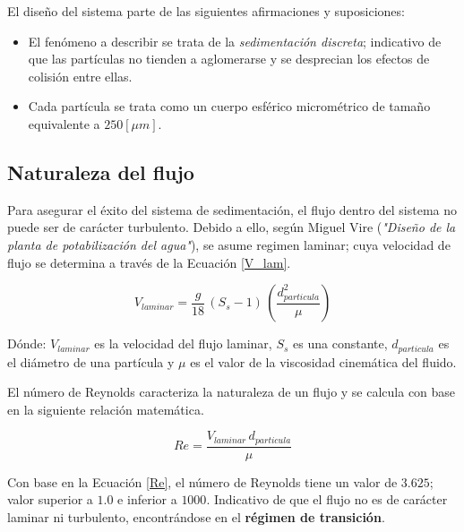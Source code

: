 \noindent
\justify

El dise\~no del sistema parte de las siguientes afirmaciones y suposiciones:

\begin{itemize}
	\item El fen\'omeno a describir se trata de la \textit{sedimentaci\'on discreta}; indicativo de que las part\'iculas no tienden a aglomerarse y se desprecian los efectos de colisi\'on entre ellas. 
	\item Cada part\'icula se trata como un cuerpo esf\'erico microm\'etrico de tama\~no equivalente a $250 [\mu m]$.
\end{itemize}

\subsection{Naturaleza del flujo}

\noindent
\justify

Para asegurar el \'exito del sistema de sedimentaci\'on, el flujo dentro del sistema no puede ser de car\'acter turbulento. Debido a ello, seg\'un Miguel Vire (\textit{"Dise\~no de la planta de potabilizaci\'on del agua"}), se asume regimen laminar; cuya velocidad de flujo se determina a trav\'es de la Ecuaci\'on \ref{V_lam}.

\begin{equation}
	V_{laminar} = \frac{g}{18} \, (S_s - 1) \, \left(\frac{d_{particula}^2}{\mu} \right)
	\label{V_lam}
\end{equation}

\noindent
\justify

D\'onde: $V_{laminar}$ es la velocidad del flujo laminar, $S_s$ es una constante, $d_{particula}$ es el di\'ametro de una part\'icula y $\mu$ es el valor de la viscosidad cinem\'atica del fluido.

\noindent
\justify

El n\'umero de Reynolds caracteriza la naturaleza de un flujo y se calcula con base en la siguiente relaci\'on matem\'atica.

\begin{equation}
	Re = \frac{V_{laminar} \, d_{particula}}{\mu}
	\label{Re}
\end{equation}

\noindent
\justify

Con base en la Ecuaci\'on \ref{Re}, el n\'umero de Reynolds tiene un valor de $3.625$; valor superior a $1.0$ e inferior a $1000$. Indicativo de que el flujo no es de car\'acter laminar ni turbulento, encontr\'andose en el \textbf{r\'egimen de transici\'on}.

